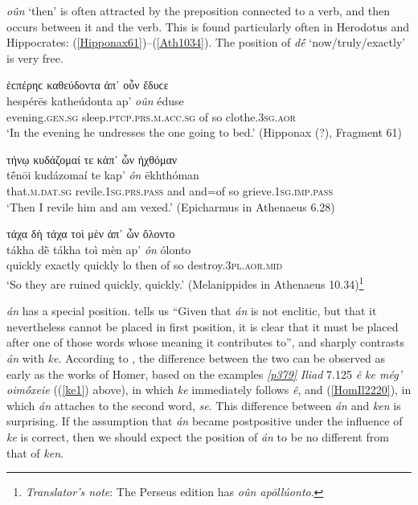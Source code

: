 \emph{oûn} `then' is often attracted by the preposition connected to a verb, and then occurs between it and the verb. This is found particularly often in Herodotus and Hippocrates: (\ref{Hipponax61})--(\ref{Ath1034}). The position of \emph{dḗ} `now/truly/exactly' is very free.

\begin{exe}
\ex ἑϲπέρηϲ καθεύδοντα ἀπ᾽ οὖν ἔδυϲε\\
\gll hespérēs katheúdonta ap' \emph{oûn} éduse\\
evening.\textsc{gen.sg} sleep.\textsc{ptcp.prs.m.acc.sg} of so clothe.\textsc{3sg.aor}\\
\trans `In the evening he undresses the one going to bed.' (Hipponax (?), Fragment 61)
\label{Hipponax61}
\end{exe}

\begin{exe}
\ex τήνῳ κυδάζομαί τε κἀπ᾽ ὦν ἠχθόμαν\\
\gll tḗnōi kudázomaí te kap' \emph{ôn} ēkhthóman\\
that.\textsc{m.dat.sg} revile.\textsc{1sg.prs.pass} and and=of so grieve.\textsc{1sg.imp.pass}\\
\trans `Then I revile him and am vexed.' (Epicharmus in Athenaeus 6.28)
\label{Ath628}
\end{exe}

\begin{exe}
\ex τάχα δὴ τάχα τοὶ μὲν ἀπ᾽ ὦν ὄλοντο\\
\gll tákha dḕ tákha toì mèn ap' \emph{ôn} ólonto\\
quickly exactly quickly lo then of so destroy.\textsc{3pl.aor.mid}\\
\trans `So they are ruined quickly, quickly.' (Melanippides in Athenaeus 10.34)\footnote{\emph{Translator's note}: The Perseus edition has \textit{oûn apōllúonto}.}
\label{Ath1034}
\end{exe}

\emph{án} has a special position. \citet[7]{Hermann1831} tells us ``Given that \textit{án} is not enclitic, but that it nevertheless cannot be placed in first position, it is clear that it must be placed after one of those words whose meaning it contributes to'', and sharply contrasts \emph{án} with \textit{ke}. According to \citeauthor{Hermann1831}, the difference between the two can be observed as early as the works of Homer, based on the examples \hyperlink{p379}{\emph{[p379]}} \textit{Iliad} 7.125 \textit{ê \emph{ke} még' oimṓxeie} ((\ref{ke1}) above), in which \textit{ke} immediately follows \textit{ê}, and (\ref{HomIl2220}), in which \emph{án} attaches to the second word, \textit{se}. This difference between \emph{án} and \textit{ken} is surprising. If the assumption that \emph{án} became postpositive under the influence of \textit{ke} is correct, then we should expect the position of \emph{án} to be no different from that of \textit{ken}.

